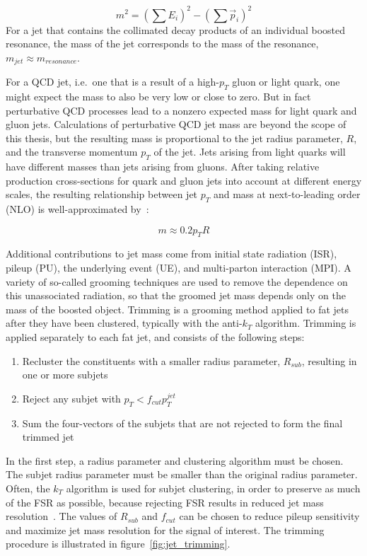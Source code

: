 \begin{equation}\label{eq:jet_mass}
    m^2 = \left(\sum E_i\right)^2 - \left(\sum \vec{p}_i \right)^2
\end{equation}
For a jet that contains the collimated decay products of an individual boosted resonance, the mass of the jet corresponds to the mass of the resonance, $m_{jet} \approx m_{resonance}$.

For a QCD jet, i.e.\ one that is a result of a high-$p_T$ gluon or light quark, one might expect the mass to also be very low or close to zero.
But in fact perturbative QCD processes lead to a nonzero expected mass for light quark and gluon jets.
Calculations of perturbative QCD jet mass are beyond the scope of this thesis, but the resulting mass is proportional to the jet radius parameter, $R$, and the transverse momentum $p_T$ of the jet.
Jets arising from light quarks will have different masses than jets arising from gluons.
After taking relative production cross-sections for quark and gluon jets into account at different energy scales, the resulting relationship between jet $p_T$ and mass at next-to-leading order (NLO) is well-approximated by~\cite{jet-mass-nlo}:

\begin{equation}\label{eq:jet_mass_nlo}
    m \approx 0.2 p_T R
\end{equation}

Additional contributions to jet mass come from initial state radiation (ISR), pileup (PU), the underlying event (UE), and multi-parton interaction (MPI).
A variety of so-called grooming techniques are used to remove the dependence on this unassociated radiation, so that the groomed jet mass depends only on the mass of the boosted object.
Trimming is a grooming method applied to fat jets after they have been clustered, typically with the anti-$k_T$ algorithm.
Trimming is applied separately to each fat jet, and consists of the following steps:

\begin{enumerate}
    \item Recluster the constituents with a smaller radius parameter, $R_{sub}$, resulting in one or more subjets
    \item Reject any subjet with $p_{T} < f_{cut} p_T^{jet}$
    \item Sum the four-vectors of the subjets that are not rejected to form the final trimmed jet
\end{enumerate}

In the first step, a radius parameter and clustering algorithm must be chosen.
The subjet radius parameter must be smaller than the original radius parameter.
Often, the $k_T$ algorithm is used for subjet clustering, in order to preserve as much of the FSR as possible, because rejecting FSR results in reduced jet mass resolution~\cite{jet-tasi-substructure}.
The values of $R_{sub}$ and $f_{cut}$ can be chosen to reduce pileup sensitivity and maximize jet mass resolution for the signal of interest.
The trimming procedure is illustrated in figure~\ref{fig:jet_trimming}.

